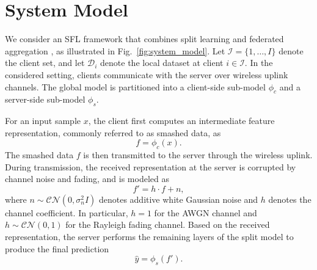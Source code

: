 


\section{System Model}

We consider an SFL framework that combines split learning and federated aggregation \cite{gupta2018distributed,thapa2022splitfed}, as illustrated in Fig.~\ref{fig:system_model}. Let $\mathcal{I}=\{1,\ldots,I\}$ denote the client set, and let $\mathcal{D}_i$ denote the local dataset at client $i \in \mathcal{I}$. In the considered setting, clients communicate with the server over wireless uplink channels. The global model is partitioned into a client-side sub-model $\phi_c$ and a server-side sub-model $\phi_s$.

For an input sample $x$, the client first computes an intermediate feature representation, commonly referred to as smashed data, as
\begin{equation}
f = \phi_c(x).
\end{equation}
The smashed data $f$ is then transmitted to the server through the wireless uplink. During transmission, the received representation at the server is corrupted by channel noise and fading, and is modeled as
\begin{equation}
f' = h \cdot f + n,
\end{equation}
where $n \sim \mathcal{CN}(0,\sigma_n^2 I)$ denotes additive white Gaussian noise and $h$ denotes the channel coefficient. In particular, $h=1$ for the AWGN channel and $h \sim \mathcal{CN}(0,1)$ for the Rayleigh fading channel. Based on the received representation, the server performs the remaining layers of the split model to produce the final prediction
\begin{equation}
\hat{y} = \phi_s(f').
\end{equation}

